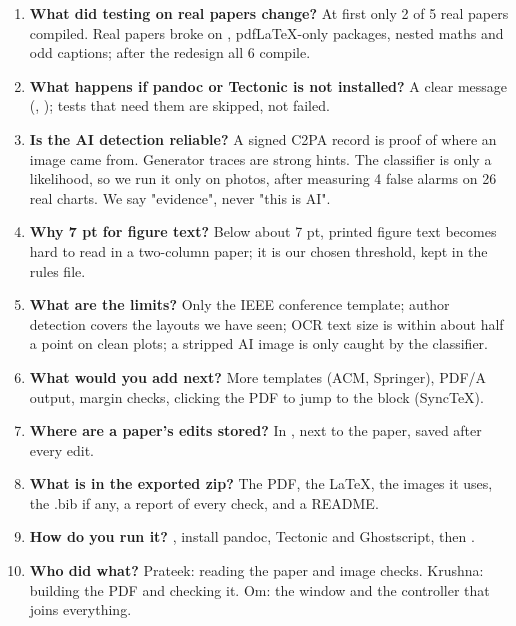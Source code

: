 \begin{enumerate}[leftmargin=2em, itemsep=0.5em]
\item \textbf{What did testing on real papers change?} At first only 2 of 5 real papers compiled. Real papers broke on , pdfLaTeX-only packages, nested maths and odd captions; after the redesign all 6 compile.
\item \textbf{What happens if pandoc or Tectonic is not installed?} A clear message (, ); tests that need them are skipped, not failed.
\item \textbf{Is the AI detection reliable?} A signed C2PA record is proof of where an image came from. Generator traces are strong hints. The classifier is only a likelihood, so we run it only on photos, after measuring 4 false alarms on 26 real charts. We say "evidence", never "this is AI".
\item \textbf{Why 7 pt for figure text?} Below about 7 pt, printed figure text becomes hard to read in a two-column paper; it is our chosen threshold, kept in the rules file.
\item \textbf{What are the limits?} Only the IEEE conference template; author detection covers the layouts we have seen; OCR text size is within about half a point on clean plots; a stripped AI image is only caught by the classifier.
\item \textbf{What would you add next?} More templates (ACM, Springer), PDF/A output, margin checks, clicking the PDF to jump to the block (SyncTeX).
\item \textbf{Where are a paper's edits stored?} In , next to the paper, saved after every edit.
\item \textbf{What is in the exported zip?} The PDF, the LaTeX, the images it uses, the .bib if any, a report of every check, and a README.
\item \textbf{How do you run it?} , install pandoc, Tectonic and Ghostscript, then .
\item \textbf{Who did what?} Prateek: reading the paper and image checks. Krushna: building the PDF and checking it. Om: the window and the controller that joins everything.
\end{enumerate}
